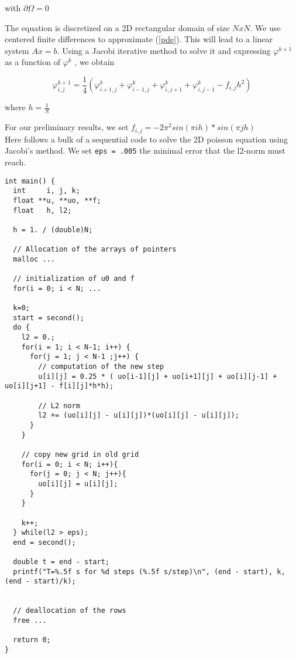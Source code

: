 \documentclass[11pt,a4paper]{article}
\begin{document}
with $\partial \Omega = 0$

The equation is discretized on a 2D rectangular domain of size $NxN$. We use centered finite differences to approximate (\ref{pde}). This will lead to a linear system $Ax = b$. Using a Jacobi iterative method to solve it and expressing $\varphi^{k+1}$ as a function of $\varphi^k$ , we obtain

\begin{equation}
\varphi_{i,j}^{k+1} = \frac{1}{4} \left( \varphi_{i+1,j}^{k} + \varphi_{i-1,j}^{k} + \varphi_{i,j+1}^{k} + \varphi_{i,j-1}^{k} -f_{i,j} h^2 \right)
\end{equation}

where $h = \frac{1}{N}$

For our preliminary results, we set $f_{i,j} = -2 \pi^2 sin(\pi i h) * sin (\pi j h) $
\\

Here follows a bulk of a sequential code to solve the 2D poisson equation using Jacobi's method. We set \texttt{eps = .005} the minimal error that the l2-norm must reach. 

\begin{lstlisting}[style=CStyle]
int main() {
  int     i, j, k;
  float **u, **uo, **f;
  float   h, l2;

  h = 1. / (double)N;

  // Allocation of the arrays of pointers
  malloc ...

  // initialization of u0 and f
  for(i = 0; i < N; ...

  k=0;
  start = second();
  do {
    l2 = 0.;
    for(i = 1; i < N-1; i++) {
      for(j = 1; j < N-1 ;j++) {
        // computation of the new step
        u[i][j] = 0.25 * ( uo[i-1][j] + uo[i+1][j] + uo[i][j-1] + uo[i][j+1] - f[i][j]*h*h);

        // L2 norm
        l2 += (uo[i][j] - u[i][j])*(uo[i][j] - u[i][j]);
      }
    }

    // copy new grid in old grid
    for(i = 0; i < N; i++){
      for(j = 0; j < N; j++){
        uo[i][j] = u[i][j];
      }
    }

    k++;
  } while(l2 > eps);
  end = second();

  double t = end - start;
  printf("T=%.5f s for %d steps (%.5f s/step)\n", (end - start), k, (end - start)/k);


  // deallocation of the rows
  free ...

  return 0;
}

\end{lstlisting}
\end{document}
